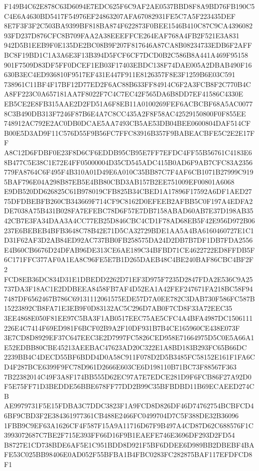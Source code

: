 \documentclass[UTF8,fontset=fandol,zihao=-4,a4paper]{ctexart}
\begin{document}
{{F149B4C62E878C63D6094E7EDC625F6C9AF2AE0537BBD8F8A9BD76FB190C5C4E6A4630BD5417F54976EF24863207AFA67082931FE5C7A5F223435DEF
8E7F3F3F2C503BA9399BF818BA874F622873F0BEE1546B410C87C9CA439608293FD237D876CFC8B709FAA2A38EEEFFCE264EAF768A4FB2F521E3A831
942D5B1EEB9F0E135DE2BC08B9F207F817646A87CA8B08234733EDB6F2AFFBC8F19BD1C1A3A6E3F13B394D5FCF6CF7DCD0B2C586B8A441A469F95158
901F7509D83DF5FF0DCEF1EB03F17403EBDC138F74DAE005A2DBAB490F16630B3EC4ED936810F9517EF431E447F911E8126357F8E3F1259B6E03C591
738961C11BF4F17BF12D77ED2F6AC88B633FF84914C6F2A3FCB8F2C770B4CA8FF223C0A657181AA7F8022F7C4C7EC42F565DA6B8DD7EF41586C4330E
EB5CE2E8FB315AAE2D2FD51A6F8EB11A0100269FEF6ACBCBF68A5AC00778C3B490DB313F7246F87B6E4A7C8CC435A2F8F58AC42529150800F0F855EE
748912AC792E2AC0DB0DCAE5AA7493CB5AE53DB04BEE0600804DAF514CFB00E5D3AD9F11C576D55F9B56FC7FFC83916B357F9BABEACBFE5C2E2E17FF
A8C12D6FDBF0E23F8D6CF6EDDB95CB95E7FF7EFDC4FF55B56761C4183E68B477C5E38C1E72E4FF05000004D35CD545ADC415B0AD6F9AB7CFC83A2356
779FA8764C6F495F4B310A01D49E6A010C35BB87C7F4AF6CB1071B27999C9195BAF796E04A298B87EB5E4BB80CBD3AB157B2EE751009EF00801A6068
E9DB520DD626825C61B978019CFB825B34CBED1A17896F17592A6DF1AED2775DFDBEBFB260CB343669F714CF9C8162D0EFEEB2AFBB5C0F197A4EDFA2
DE7038A75B431B028FA7EFEBC78D6F57E7DB7158ABAD60AB7E37D198AB3542CB7E3FA34DAA3A4CC77EB25D846CBC4CD1F78AD68EB5F42E956D972B06
237E6BEBEB4BFB3648C78B42E71D5CA32729BDE1AA5A4BA6160460727E1C1D31F62AF3D2AB84ED92AC737BB0FB258575DA24D2DB7B7DF1DB7FDA2556
E4B60CB6676D24DFAB96DE313CE6AE189C34BFBD71CE4622722ED8FFDB5F6C171FFC377AF0A1EA8C96FE5E7B1D265DAEB48C4BE240BAF86CBC4BF2F2
FCD8EB36DC834D31E1DBEDD2262D71EF3D975F7235D2847FDA2E536C9A25737DA3F18AC1E2DDBEEA8458FB7AF4D52EA1A42FEF247671FA218BC58F94
7487DF6562467B786C69131112061575EDE57D7A0EE782C3DAB730F586FC587B15223892CB8FA71E3EB9F0D83132AC5C296D7AB0F7CD8F33A72EEC35
3EE4868E050F81EE97C5BA3F1AB0517EEC75AE5CFC4A4BFA4987DC1506111226E4C7414F69ED981F6BCF02B9A2F10DF931B7B4CE165960CE438E073F
3E7CD8D8929EF37C647EEC3E2D7997FC5826CED958E71664975D5C0E5A66A1E52EDBB80CBE45213AEEBAC47623AD20C322E1A8BD183B293FC65B66DC
2239BB4C4DECD55BF6BDD4D0A58C911F078D2D5B3485FC58152E161F1FA6CD4F287BCE6399F9FC78D961D2666E603CE6D198110B71BC73F88567F363
7B22382014C49F3A8F174BB555D62EC97A7E7EDCE281D9F6FCB86F27A92D0F5E75FF71D3BEDDE56BBE678FF77DD2B99C35BFBDBD11B69ECAEED274CB
AE9979731F5E15FDBA3C7DDC3823F1A9FCD8D826DF46D74762754BCBFCD46BF9CBD3F2E384361977361CB488E2466FC0499704D7C5F388DE32B36096
1FBB9C9EF63A1626CF4F587F15A9A11716D67F9B497A4CD87D62C688576F1C3993072687C7BE2F715E393FF66D16F9B1EAEFE746E3696DF293D2FD54
B8727E1CD738BDE6AF5E1C951BDD8D921F5BF6DDEE6D989BB2DBEBF4BAFE53C025BB98406E0AD052F55BFBA1B4FBC0283FC282875BAF117EFDFCD8F1
}}
\end{document}
